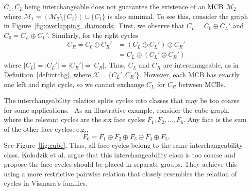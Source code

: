 \documentclass[fleqn,11pt]{article}
\newcommand\calM{\mathcal{M}}
\newcommand\calX{\mathcal{X}}     %
\begin{document}
$C_1,C_2$ being interchangeable does not guarantee the existence of an MCB $\calM_2$ where $\calM_1=(\calM_2\setminus\{C_2\})\cup\{C_1\}$ is also minimal. To see this, consider the graph in Figure~\ref{fig:overlapping_diamonds}.
First, we observe that $C_L = C_0\oplus C_L'$ and $C_0 = C_L \oplus C_L'$. Similarly, for the right cycles%
\begin{equation}
	\begin{split}
	C_R = C_0\oplus C_R' &=( {C_L \oplus C_L'}) \mathrel{\oplus} C_R' \\&= C_L \oplus (C_L'\oplus C_R')
	\end{split}
	\label{eq:ind_ex}
\end{equation}
where $|C_L|=|C_L'|=|C_R'|=|C_R|$. 
Thus, $C_L$ and $C_R$ are interchangeable, as in Definition~\ref{def:intchg}, where $\calX=\{C_L',C_R'\}$.
However, each MCB has exactly one left and right cycle, so we cannot exchange $C_L$ for $C_R$ between MCBs.


{The interchangeability relation splits cycles into classes that may be too coarse for some applications.~\cite{kolodzikUnique2012}} %
As an illustrative example, consider the cube graph, where the relevant cycles are the six face cycles $F_1,F_2,\hdots,F_6$. Any face is the sum of the other face cycles, e.g.,%
\begin{equation}
	F_6 = F_1 \oplus  F_2\oplus F_3 \oplus F_4 \oplus F_5.\label{eq:cube_face_intchg}
\end{equation}
See Figure~\ref{fig:cube}. 
Thus, all face cycles belong to the same interchangeability class. 
Kolodzik {et al.} \cite{kolodzikUnique2012} argue that this interchangeability class is too coarse and propose the face cycles should be placed in separate groups. They achieve this using a more restrictive pairwise relation that closely resembles the relation of cycles in Vismara's families.
\end{document}
